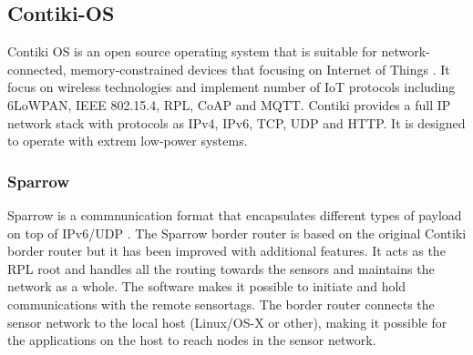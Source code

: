 \subsection{Contiki-OS}
Contiki OS is an open source operating system that is suitable for network-connected, memory-constrained devices that focusing on Internet of Things \cite{contiki-os}. It focus on wireless technologies and implement number of IoT protocols including 6LoWPAN, IEEE 802.15.4, RPL, CoAP and MQTT. Contiki provides a full IP network stack with protocols as IPv4, IPv6, TCP, UDP and HTTP. It is designed to operate with extrem low-power systems.


\subsubsection{Sparrow}
Sparrow is a commnunication format that encapsulates different types of payload on top of IPv6/UDP \cite{Sparrow}. The Sparrow border router is based on the original Contiki border router but it has been improved with additional features. It acts as the RPL root and handles all the routing towards the sensors and maintains the network as a whole. The software makes it possible to initiate and hold communications with the remote sensortags. The border router connects the sensor network to the local host (Linux/OS-X or other), making it possible for the applications on the host to reach nodes in the sensor network. 

